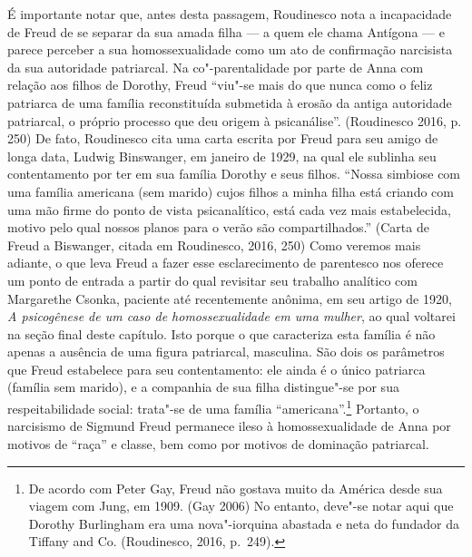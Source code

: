 É importante notar que, antes desta passagem, Roudinesco nota a
incapacidade de Freud de se separar da sua amada filha --- a quem ele
chama Antígona --- e parece perceber a sua homossexualidade como um ato
de confirmação narcisista da sua autoridade patriarcal. Na
co"-parentalidade por parte de Anna com relação aos filhos de Dorothy,
Freud ``viu"-se mais do que nunca como o feliz patriarca de uma família
reconstituída submetida à erosão da antiga autoridade patriarcal, o
próprio processo que deu origem à psicanálise''. (Roudinesco 2016, p.
250) De fato, Roudinesco cita uma carta escrita por Freud para seu amigo
de longa data, Ludwig Binswanger, em janeiro de 1929, na qual ele
sublinha seu contentamento por ter em sua família Dorothy e seus filhos.
``Nossa simbiose com uma família americana (sem marido) cujos filhos a
minha filha está criando com uma mão firme do ponto de vista
psicanalítico, está cada vez mais estabelecida, motivo pelo qual nossos
planos para o verão são compartilhados.'' (Carta de Freud a Biswanger,
citada em Roudinesco, 2016, 250) Como veremos mais adiante, o que leva
Freud a fazer esse esclarecimento de parentesco nos oferece um ponto de
entrada a partir do qual revisitar seu trabalho analítico com Margarethe
Csonka, paciente até recentemente anônima, em seu artigo de 1920,
\emph{A psicogênese de um caso de homossexualidade em uma mulher}, ao
qual voltarei na seção final deste capítulo. Isto porque o que
caracteriza esta família é não apenas a ausência de uma figura
patriarcal, masculina. São dois os parâmetros que Freud estabelece para
seu contentamento: ele ainda é o único patriarca (família sem marido), e
a companhia de sua filha distingue"-se por sua respeitabilidade social:
trata"-se de uma família ``americana''.\footnote{De acordo com Peter Gay,
  Freud não gostava muito da América desde sua viagem com Jung, em 1909.
  (Gay 2006) No entanto, deve"-se notar aqui que Dorothy Burlingham era
  uma nova"-iorquina abastada e neta do fundador da Tiffany and Co.
  (Roudinesco, 2016, p.~249).} Portanto, o narcisismo de Sigmund Freud
permanece ileso à homossexualidade de Anna por motivos de ``raça'' e
classe, bem como por motivos de dominação patriarcal.

